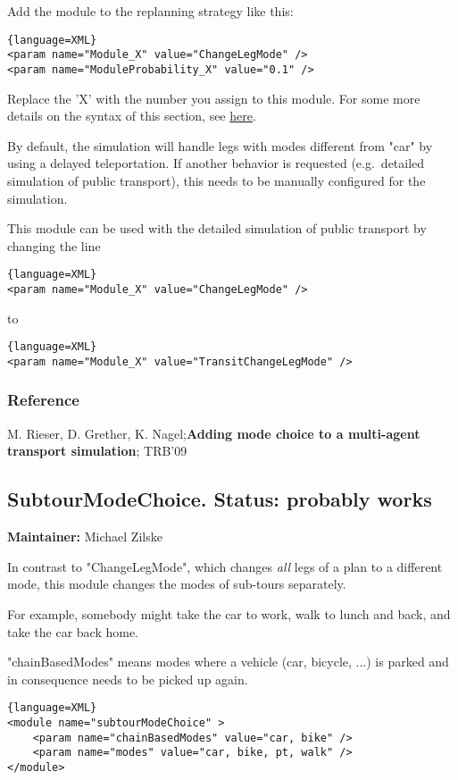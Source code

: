 Add the module to the replanning strategy like this:
\begin{lstlisting}{language=XML}
<param name="Module_X" value="ChangeLegMode" />
<param name="ModuleProbability_X" value="0.1" />
\end{lstlisting}

Replace the 'X' with the number you assign to this module. For some more details on the syntax of this section, see \href{http://matsim.org/node/478}{here}.

By default, the simulation will handle legs with modes different from  "car" by using a delayed teleportation. If another behavior is  requested (e.g.\ detailed simulation of public transport), this needs to  be manually configured for the simulation.

This module can be used with the detailed simulation of public transport by changing the line

\begin{lstlisting}{language=XML}
<param name="Module_X" value="ChangeLegMode" />
\end{lstlisting}

to

\begin{lstlisting}{language=XML}
<param name="Module_X" value="TransitChangeLegMode" />
\end{lstlisting}

\subsubsection{Reference}

M. Rieser, D. Grether, K. Nagel;\textbf{Adding mode choice to a multi-agent transport simulation}; TRB'09

\subsection{SubtourModeChoice. Status: probably works}

\textbf{Maintainer:} Michael Zilske

In contrast to "ChangeLegMode", which changes \emph{all} legs of a plan to a different mode, this module changes the modes of sub-tours separately.

For example, somebody might take the car to work, walk to lunch and back, and take the car back home.

"chainBasedModes" means modes where a vehicle (car, bicycle,  ...) is parked and in consequence needs to be picked up again.
\begin{lstlisting}{language=XML}
<module name="subtourModeChoice" >
    <param name="chainBasedModes" value="car, bike" />
    <param name="modes" value="car, bike, pt, walk" />
</module>
\end{lstlisting}


